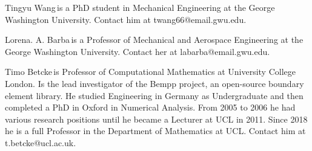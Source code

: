 \documentclass{IEEEcsmag}
\begin{document}
\begin{IEEEbiography}{Tingyu Wang}{\,}is a PhD student in Mechanical Engineering at the George Washington University. Contact him at twang66@email.gwu.edu.
\end{IEEEbiography}

\begin{IEEEbiography}{Lorena. A. Barba}{\,}is a Professor of Mechanical and Aerospace Engineering at the George Washington University.  Contact her at labarba@email.gwu.edu.
\end{IEEEbiography}

\begin{IEEEbiography}{Timo Betcke}{\,}is Professor of Computational Mathematics at University College London. Is the lead investigator of the Bempp project, an open-source boundary element library. He studied Engineering in Germany as Undergraduate and then completed a PhD in Oxford in Numerical Analysis. From 2005 to 2006 he had various research positions until he became a Lecturer at UCL in 2011. Since 2018 he is a full Professor in the Department of Mathematics at UCL. Contact him at t.betcke@ucl.ac.uk.
\end{IEEEbiography}
\end{document}
